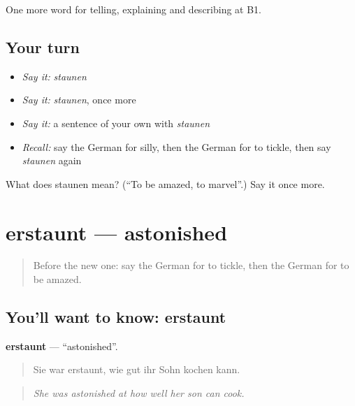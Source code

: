 \begin{grammarlens}[title={What you've built}]
One more word for telling, explaining and describing at B1.
\end{grammarlens}

\subsection*{Your turn}
\begin{itemize}
\raggedright
  \item \emph{Say it:} \emph{staunen}
  \item \emph{Say it:} \emph{staunen}, once more
  \item \emph{Say it:} a sentence of your own with \emph{staunen}
  \item \emph{Recall:} say the German for silly, then the German for to tickle, then say \emph{staunen} again
\end{itemize}

\begin{tcolorbox}[breakable,colback=teal!4,colframe=teal!35!black,title={Before you move on}]
What does staunen mean? (\textquotedblleft{}To be amazed, to marvel\textquotedblright{}.) Say it once more.
\end{tcolorbox}
\section[erstaunt]{erstaunt — astonished}

\label{lesson:GE-C474-erstaunt}



\begin{quote}
Before the new one: say the German for to tickle, then the German for to be amazed.
\end{quote}

\subsection*{You'll want to know: erstaunt}
\textbf{erstaunt} — \textquotedblleft{}astonished\textquotedblright{}.

\begin{quote}
Sie war erstaunt, wie gut ihr Sohn kochen kann.
\end{quote}

\begin{quote}
\emph{She was astonished at how well her son can cook.}
\end{quote}

